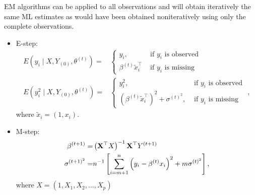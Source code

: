 \begin{example}
	EM algorithms can be applied to all observations and will obtain iteratively the same ML estimates as would have been obtained noniteratively using only the complete observations.

	\begin{itemize}
		\item E-step:
		      \begin{equation}
			      \begin{aligned}
				      E\left(y_{i} \mid X, Y_{(0)}, \theta^{(t)}\right)=     & \left\{\begin{array}{ll}
					                                                                      y_{i},                           & \text { if } y_{i} \text { is observed } \\
					                                                                      \beta^{(t)} \tilde{x}_{i}^{\top} & \text { if } y_{i} \text { is missing }
				                                                                      \end{array}\right.                                                                                       \\
				      E\left(y_{i}^{2} \mid X, Y_{(0)}, \theta^{(t)}\right)= & \left\{\begin{array}{ll}
					                                                                      y_{i}^{2},                                                          & \text { if } y_{i} \text { is observed } \\
					                                                                      \left(\beta^{(t)} \tilde{x}_{i}^{\top}\right)^{2}+\sigma^{(t)^{2}}, & \text { if } y_{i} \text { is missing }
				                                                                      \end{array}\right.,
			      \end{aligned}
		      \end{equation}
		      where \(\tilde{x}_{i}=(1,x_{i})\).
		\item M-step:
		      \begin{equation}
			      \begin{aligned}
				      \beta^{(t+1)}=      & \left(\mathbf{X}^{\top} X\right)^{-1} \mathbf{X}^{\top} Y^{(t+1)}                                           \\
				      \sigma^{(t+1)^{2}}= & n^{-1}\left[\sum_{i=m+1}^{n}\left(y_{i}-\beta^{(t)} x_{i}\right)^{2}+m \sigma^{(t)^{2}}\right],
			      \end{aligned}
		      \end{equation}
		      where \(X=(1,X_1,X_2,\ldots,X_p)\)
	\end{itemize}
\end{example}

